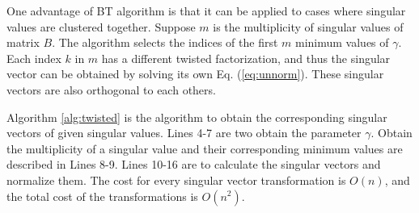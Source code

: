 One advantage of BT algorithm is that it can be applied to cases where singular values are clustered together.
Suppose $m$ is the multiplicity of singular values of matrix $B$. 
The algorithm selects the indices of the first $m$ minimum values of $\gamma$. %
Each index $k$ in $m$ has a different twisted factorization, and thus the singular vector can be obtained by solving its own Eq. (\ref{eq:unnorm}). These singular vectors are also orthogonal to each others\cite{09NLAAtwisted}.

Algorithm \ref{alg:twisted} is the algorithm to obtain the corresponding singular vectors of given singular values.
Lines 4-7 are two obtain the parameter $\gamma$.
Obtain the multiplicity of a singular value and their corresponding minimum values are described in Lines 8-9.
Lines 10-16 are to calculate the singular vectors and normalize them.
The cost for every singular vector transformation is $O(n)$, and the total cost of the transformations is $O(n^2)$.


